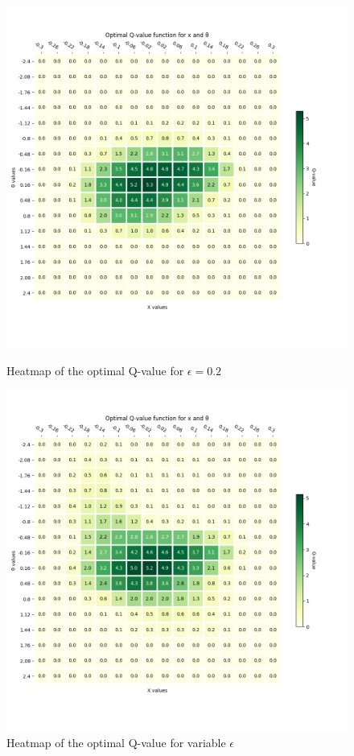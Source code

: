 \documentclass[12pt]{article}
\begin{document}
\begin{figure}[ht]
    \centering
   \begin{minipage}{0.48\textwidth}
     \centering
     \includegraphics[width=0.9\linewidth]{exercise-3/plots/heatmap-fixed-0.2.png}
     \caption{Heatmap of the optimal Q-value for $\epsilon=0.2$}
     \label{fig:task-2-1}
   \end{minipage}\hfill
   \begin{minipage}{0.48\textwidth}
     \centering
     \includegraphics[width=0.9\linewidth]{exercise-3/plots/heatmap-variable-0.0.png}
     \caption{Heatmap of the optimal Q-value for variable $\epsilon$}
     \label{fig:task-2-2}
   \end{minipage}
\end{figure}
\end{document}
